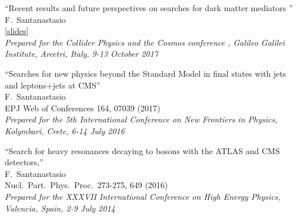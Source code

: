 \documentclass[10pt, a4paper]{article}
\begin{document}
\begin{thebibliography}{599}
  ``Recent results and future perspectives on searches for dark matter mediators ''
  \\{}F.~Santanastasio
  \\{}[\href{http://www.roma1.infn.it/exp/cms/talks/conferences/GGI2017conference_SearchForDMmediators_ATLASandCMS_santanastasio_v2.pdf}{slides}]
  \\{}{\it Prepared for the Collider Physics and the Cosmos conference
    , Galileo Galilei Institute, Arcetri, Italy, 9-13 October 2017}

  ``Searches for new physics beyond the Standard Model in final states
  with jets and leptons+jets at CMS''
  \\{}F.~Santanastasio
   \\{} EPJ Web of Conferences 164, 07039 (2017)
  \\{}{\it Prepared for the 5th International Conference on New
    Frontiers in Physics, Kolymbari, Crete, 6-14 July 2016} 

``Search for heavy resonances decaying to bosons with the ATLAS and CMS detectors,'' 
 \\{}F.~Santanastasio 
 \\ Nucl.\ Part.\ Phys.\ Proc.\  273-275, 649 (2016)
  \\{}{\it Prepared for the XXXVII International Conference on High Energy Physics, Valencia, Spain, 2-9 July 2014}





\end{thebibliography}
\end{document}

